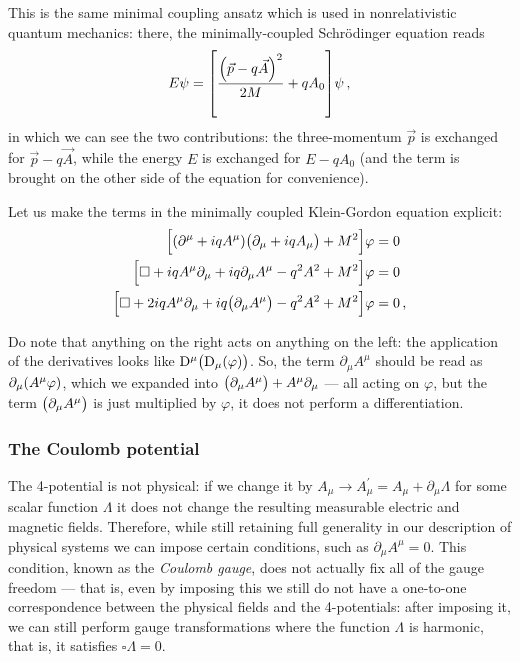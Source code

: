 \documentclass[main.tex]{subfiles}
\begin{document}
This is the same minimal coupling ansatz which is used in nonrelativistic quantum mechanics: there, the minimally-coupled Schrödinger equation reads 
%
\begin{align}
E \psi = \qty[\frac{\qty(\vec{p} - q \vec{A})^2}{2M}  + q A_0 ] \psi 
\,,
\end{align}
%
in which we can see the two contributions: the three-momentum \(\vec{p}\) is exchanged for \(\vec{p} - q \vec{A}\), while the energy \(E\) is exchanged for \(E - q A_0 \) (and the term is brought on the other side of the equation for convenience). 

Let us make the terms in the minimally coupled Klein-Gordon equation explicit: 
%
\begin{align}
\qty[\qty(\partial^{\mu } +iqA^{\mu }) \qty(\partial_{\mu } +i q A_{\mu }) + M^2] \varphi &= 0  \\
\qty[\square + iq A^{\mu } \partial_{\mu } + iq \partial_{\mu } A^{\mu } - q^2A^2 + M^2] \varphi &=0  \\
\qty[\square + 2iq A^{\mu } \partial_{\mu } + iq \qty(\partial_{\mu } A^{\mu }) - q^2A^2 + M^2] \varphi &=0  
\,,
\end{align}
%

Do note that anything on the right acts on anything on the left: the application of the derivatives looks like \(
\mathrm{D}^{\mu } \qty(\mathrm{D}_{\mu } \qty(\varphi ))\). So, the term 
\(\partial_{\mu } A^{\mu }\) should be read as \(\partial_{\mu } \qty(A^{\mu } \varphi )\), which we expanded into \(\qty(\partial_{\mu } A^{\mu }) + A^{\mu } \partial_{\mu }\) --- all acting on \(\varphi \), but the term \(\qty(\partial_{\mu }A^{\mu })\) is just multiplied by \(\varphi \), it does not perform a differentiation.

\subsubsection{The Coulomb potential}

The 4-potential is not physical: if we change it by \(A_{\mu } \rightarrow A^{\prime }_{\mu } = A_{\mu } + \partial_{\mu } \Lambda \) for some scalar function \(\Lambda \) it does not change the resulting measurable electric and magnetic fields. 
Therefore, while still retaining full generality in our description of physical systems we can impose certain conditions, such as \(\partial_{\mu } A^{\mu } = 0\). 
This condition, known as the \emph{Coulomb gauge}, does not actually fix all of the gauge freedom --- that is, even by imposing this we still do not have a one-to-one correspondence between the physical fields and the 4-potentials: after imposing it, we can still perform gauge transformations where the function \(\Lambda \) is harmonic, that is, it satisfies \(\square \Lambda = 0\). 
\end{document}

